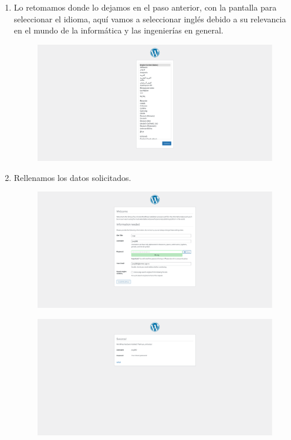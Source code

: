 \documentclass[a4paper]{article}
\begin{document}
\begin{enumerate}

    \item Lo retomamos donde lo dejamos en el paso anterior, con la pantalla para seleccionar el idioma, aquí vamos a seleccionar inglés debido a su relevancia en el mundo de la informática y las ingenierías en general.
    \begin{figure}[!h]
        \centering
        \includegraphics[width=0.8\linewidth]{images/wp_install1.png}
    \end{figure}

    \item Rellenamos los datos solicitados.
    \begin{figure}[!h]
        \centering
        \includegraphics[width=0.8\linewidth]{images/wp_install2.png}
    \end{figure}
    \begin{figure}[!h]
        \centering
        \includegraphics[width=0.8\linewidth]{images/wp_install3.png}
    \end{figure}


\end{enumerate}
\end{document}

